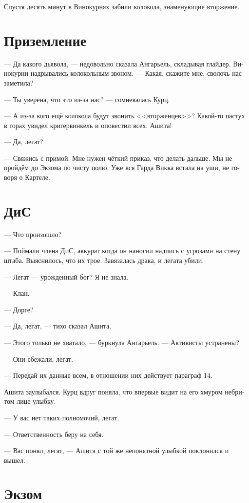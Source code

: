 \documentclass[a4paper,12pt,fleqn]{book}\usepackage{polyglossia}\setdefaultlanguage[babelshorthands=true]{russian}\setotherlanguage{english}\defaultfontfeatures{Ligatures=TeX,Mapping=tex-text}\usepackage{xcolor}\newcommand{\ml}[3]{#2}
\begin{document}
Спустя десять минут в Винокурнях забили колокола, знаменующие вторжение.

\section{Приземление}

--- Да какого дьявола, --- недовольно сказала Ангарьель, складывая глайдер.
Винокурни надрывались колокольным звоном.
--- Какая, скажите мне, сволочь нас заметила?

--- Ты уверена, что это из-за нас? --- сомневалась Курц.

--- А из-за кого ещё колокола будут звонить <<вторженцев>>?
Какой-то пастух в горах увидел кригервинкель и оповестил всех.
Ашита!

--- Да, легат?

--- Свяжись с примой.
Мне нужен чёткий приказ, что делать дальше.
Мы не пройдём до Экзома по чисту полю.
Уже вся Гарда Викка встала на уши, не говоря о Картеле.

\section{ДиС}

--- Что произошло?

--- Поймали члена ДиС, аккурат когда он наносил надпись с угрозами на стену штаба.%
Выяснилось, что их трое.
Завязалась драка, и легата убили.

--- Легат --- урожденный бог?
Я не знала.

--- Клан.

--- Дорге?

--- Да, легат, --- тихо сказал Ашита.

--- Этого только не хватало, --- буркнула Ангарьель.
--- Активисты устранены?

--- Они сбежали, легат.

--- Передай их данные всем, в отношении них действует параграф 14.

Ашита заулыбался.
Курц вдруг поняла, что впервые видит на его хмуром небритом лице улыбку.

--- У вас нет таких полномочий, легат.

--- Ответственность беру на себя.

--- Вас понял, легат, --- Ашита с той же непонятной улыбкой поклонился и вышел.

\section{Экзом}
\end{document}
